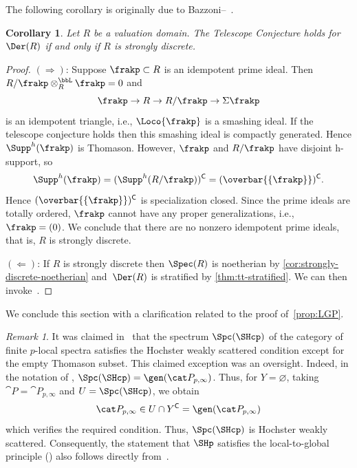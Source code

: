 \documentclass{amsart}
\numberwithin{equation}{section}%
\newtheorem{Cor}[equation]{Corollary}
\theoremstyle{remark}
\newtheorem{Rem}[equation]{Remark}
\renewcommand{\emptyset}{\varnothing}
\renewcommand{\complement}{{\mkern-1mu\mathsf{C}}}
\renewcommand{\complement}{{\mathsf{C}}}
\begin{document}
The following corollary is originally due to Bazzoni--\Stovicek~\cite[Theorem~7.2]{BazzoniStovicek17}.

\begin{Cor}\label{cor:tc-char}
  Let $R$ be a valuation domain. The Telescope Conjecture holds for~$\Der(R)$ if and only if $R$ is strongly discrete.
\end{Cor}

\begin{proof}
	$(\Rightarrow)$: Suppose $\frakp \subset R$ is an idempotent prime ideal. Then $R/\frakp \otimes_R^\bbL \frakp = 0$ and
	\[
		\frakp \to R \to R/\frakp \to \Sigma \frakp
	\]
	is an idempotent triangle, i.e., $\Loco{\frakp}$ is a smashing ideal. If the telescope conjecture holds then this smashing ideal is compactly generated. Hence $\Supp^h(\frakp)$ is Thomason. However, $\frakp$ and $R/\frakp$ have disjoint h-support, so 
	\[
		\Supp^h(\frakp) = (\Supp^h(R/\frakp))^\complement = (\overbar{\{\frakp\}})^\complement.
	\]
	Hence $(\overbar{\{\frakp\}})^\complement$ is specialization closed. Since the prime ideals are totally ordered, $\frakp$ cannot have any proper generalizations, i.e., $\frakp = (0)$. We conclude that there are no nonzero idempotent prime ideals, that is, $R$ is strongly discrete.

	$(\Leftarrow)$: If $R$ is strongly discrete then $\Spec(R)$ is noetherian by \cref{cor:strongly-discrete-noetherian} and~$\Der(R)$ is stratified by \cref{thm:tt-stratified}. We can then invoke~\cite[Thm.~9.11]{BarthelHeardSanders23a}.
\end{proof}

We conclude this section with a clarification related to the proof of~\cref{prop:LGP}.

\begin{Rem}
	It was claimed in~\cite[Remark~7.8]{Zou25} that the spectrum $\Spc(\SHcp)$ of the category of finite $p$-local spectra satisfies the Hochster weakly scattered condition except for the empty Thomason subset. This claimed exception was an oversight. Indeed, in the notation of \cite[Example~6.5]{Zou25}, $\Spc(\SHcp)=\gen(\cat P_{p,\infty})$. Thus, for $Y=\emptyset$, taking $\cat P=\cat P_{p,\infty}$ and $U=\Spc(\SHcp)$, we obtain
	\[
		\cat P_{p,\infty} \in U \cap Y^\complement = \gen(\cat P_{p,\infty})
	\]
	which verifies the required condition. Thus, $\Spc(\SHcp)$ is Hochster weakly scattered. Consequently, the statement that $\SHp$ satisfies the local-to-global principle (\cite[Proposition~7.3]{Zou25}) also follows directly from~\cite[Theorem~7.6]{Zou25}.
\end{Rem}
\end{document}
